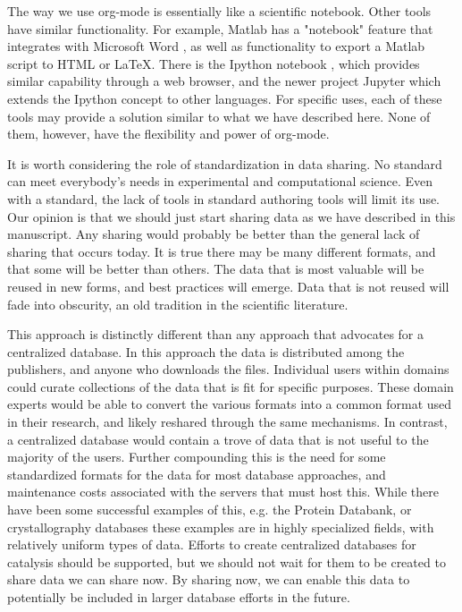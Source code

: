 \documentclass[journal=accacs,manuscript=article,email=true]{achemso}
\begin{document}
The way we use org-mode is essentially like a scientific notebook. Other tools have similar functionality. For example, Matlab has a "notebook" feature that integrates with Microsoft Word \cite{mathworks-matlab-noteb}, as well as functionality to export a Matlab script to HTML or \LaTeX{}. There is the Ipython notebook \cite{perez-2007-ipyth}, which provides similar capability through a web browser, and the newer project Jupyter \cite{projec-juypy} which extends the Ipython concept to other languages. For specific uses, each of these tools may provide a solution similar to what we have described here. None of them, however, have the flexibility and power of org-mode.

It is worth considering the role of standardization in data sharing.  No standard can meet everybody's needs in experimental and computational science.  Even with a standard, the lack of tools in standard authoring tools will limit its use. Our opinion is that we should just start sharing data as we have described in this manuscript. Any sharing would probably be better than the general lack of sharing that occurs today. It is true there may be many different formats, and that some will be better than others. The data that is most valuable will be reused in new forms, and best practices will emerge. Data that is not reused will fade into obscurity, an old tradition in the scientific literature.

This approach is distinctly different than any approach that advocates for a centralized database. In this approach the data is distributed among the publishers, and anyone who downloads the files. Individual users within domains could curate collections of the data that is fit for specific purposes. These domain experts would be able to convert the various formats into a common format used in their research, and likely reshared through the same mechanisms. In contrast, a centralized database would contain a trove of data that is not useful to the majority of the users. Further compounding this is the need for some standardized formats for the data for most database approaches, and maintenance costs associated with the servers that must host this. While there have been some successful examples of this, e.g. the Protein Databank, or crystallography databases these examples are in highly specialized fields, with relatively uniform types of data. Efforts to create centralized databases for catalysis should be supported, but we should not wait for them to be created to share data we can share now. By sharing now, we can enable this data to potentially be included in larger database efforts in the future.
\end{document}
